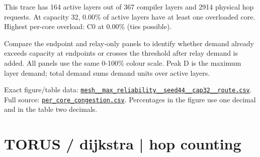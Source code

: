 \documentclass[10pt,a4paper]{article}
\begin{document}
This trace has 164 active layers out of 367 compiler layers and 2914 physical hop requests. At capacity 32, 0.00\% of active layers have at least one overloaded core. Highest per-core overload: C0 at 0.00\% (ties possible).\par
Compare the endpoint and relay-only panels to identify whether demand already exceeds capacity at endpoints or crosses the threshold after relay demand is added. All panels use the same 0-100\% colour scale. Peak D is the maximum layer demand; total demand sums demand units over active layers.\par
Exact figure/table data: \href{\detokenize{file:///home/dhruv-pansuriya/Documents/BTP/Compiler-Driven-ACE/output/pdf/qaoa_methods_congestion/tables/mesh__max_reliability__seed44__cap32__route.csv}}{\nolinkurl{mesh__max_reliability__seed44__cap32__route.csv}}. Full source: \href{\detokenize{file:///home/dhruv-pansuriya/Documents/BTP/Compiler-Driven-ACE/results/qaoa_2seed_2026-10-26/congestion/per_core_congestion.csv}}{\nolinkurl{per_core_congestion.csv}}. Percentages in the figure use one decimal and in the table two decimals.\par
\clearpage
\section*{TORUS / dijkstra | hop counting}
\end{document}
